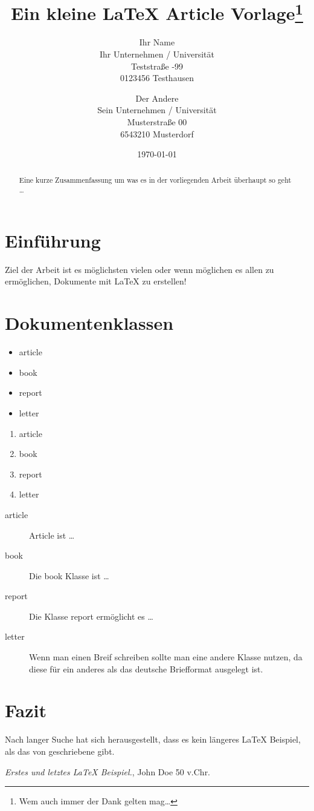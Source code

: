 ﻿\documentclass{article}
\title{Ein kleine \LaTeX{} Article Vorlage\thanks{Wem auch immer
	 der Dank gelten mag\ldots}}
\author{Ihr Name  \\
	Ihr Unternehmen / Universit\"at  \\
	Teststra\ss e -99 \\
	0123456 Testhausen \\
	\and 
	Der Andere  \\
	Sein Unternehmen / Universit\"at \\
	Musterstra\ss e 00 \\
	6543210 Musterdorf \\
	}
\date{\today}
\begin{document}
\maketitle


\begin{abstract}
Eine kurze Zusammenfassung um was es in der vorliegenden Arbeit \"uberhaupt
so geht \ldots
\end{abstract}

\section{Einf\"uhrung}
Ziel der Arbeit ist es m\"oglichsten vielen oder wenn m\"oglichen es allen 
zu erm\"oglichen, Dokumente mit \LaTeX{} zu erstellen!




\begin{figure}
\centering

\end{figure}

\section{Dokumentenklassen} \label{documentclasses}

\begin{itemize}
\item article
\item book 
\item report 
\item letter 
\end{itemize}


\begin{enumerate}
\item article
\item book 
\item report 
\item letter 
\end{enumerate}

\begin{description}
\item[article\label{article}]{Article ist \ldots}
\item[book\label{book}]{Die book Klasse ist \ldots}
\item[report\label{report}]{Die Klasse report erm\"oglicht es  \ldots}
\item[letter\label{letter}]{Wenn man einen Breif schreiben sollte man eine 
	andere Klasse nutzen, da diese f\"ur ein anderes als das deutsche 
	Briefformat ausgelegt ist.}
\end{description}


\section{Fazit}\label{conclusions}
Nach langer Suche hat sich herausgestellt, dass es kein l\"angeres 
\LaTeX{} Beispiel, als das von \cite{doe} geschriebene gibt. 

\begin{thebibliography}{9}
 \emph{Erstes und letztes \LaTeX{} Beispiel.},
John Doe 50 v.Chr.  
\end{thebibliography}
\end{document}
